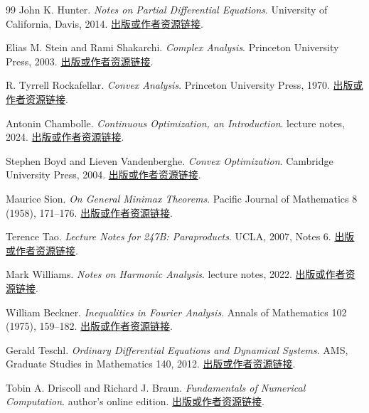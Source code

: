 \begin{thebibliography}{99}
 John K. Hunter. \emph{Notes on Partial Differential Equations}. University of California, Davis, 2014. \href{https://math.ucdavis.edu/~hunter/pdes/pde_notes.pdf}{出版或作者资源链接}.

 Elias M. Stein and Rami Shakarchi. \emph{Complex Analysis}. Princeton University Press, 2003. \href{https://press.princeton.edu/books/hardcover/9780691113852/complex-analysis}{出版或作者资源链接}.

 R. Tyrrell Rockafellar. \emph{Convex Analysis}. Princeton University Press, 1970. \href{https://press.princeton.edu/books/paperback/9780691015866/convex-analysis}{出版或作者资源链接}.

 Antonin Chambolle. \emph{Continuous Optimization, an Introduction}. lecture notes, 2024. \href{https://www.ceremade.dauphine.fr/~chambolle/data/medias/optimisation/coursopti2024.pdf}{出版或作者资源链接}.

 Stephen Boyd and Lieven Vandenberghe. \emph{Convex Optimization}. Cambridge University Press, 2004. \href{https://web.stanford.edu/~boyd/cvxbook/}{出版或作者资源链接}.

 Maurice Sion. \emph{On General Minimax Theorems}. Pacific Journal of Mathematics 8 (1958), 171--176. \href{https://doi.org/10.2140/pjm.1958.8.171}{出版或作者资源链接}.

 Terence Tao. \emph{Lecture Notes for 247B: Paraproducts}. UCLA, 2007, Notes 6. \href{https://www.math.ucla.edu/~tao/247b.1.07w/notes6.pdf}{出版或作者资源链接}.

 Mark Williams. \emph{Notes on Harmonic Analysis}. lecture notes, 2022. \href{https://markwilliams.web.unc.edu/wp-content/uploads/sites/19674/2022/01/notesonharmonicanalysisB.pdf}{出版或作者资源链接}.

 William Beckner. \emph{Inequalities in Fourier Analysis}. Annals of Mathematics 102 (1975), 159--182. \href{https://annals.math.princeton.edu/1975/102-1/p11}{出版或作者资源链接}.

 Gerald Teschl. \emph{Ordinary Differential Equations and Dynamical Systems}. AMS, Graduate Studies in Mathematics 140, 2012. \href{https://www.mat.univie.ac.at/~gerald/ftp/book-ode/}{出版或作者资源链接}.

 Tobin A. Driscoll and Richard J. Braun. \emph{Fundamentals of Numerical Computation}. author's online edition. \href{https://fncbook.com/}{出版或作者资源链接}.


\end{thebibliography}
